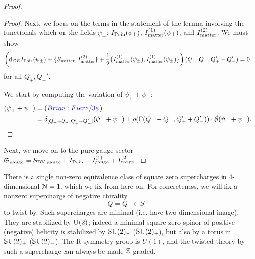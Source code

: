 \documentclass[10pt, oneside]{article}
\begin{document}
\begin{proof}
\begin{proof}
Next, we focus on the terms in the statement of the lemma involving the functionals which on the fields $\psi_{\pm}$: $I_{\rm Poin}(\psi_{\pm})$, $I^{(1)}_{\rm matter}(\psi_{\pm})$, and $I^{(2)}_{\rm matter}$. 
We must show
\[
\left({\rm d}_{CE} I_{\rm Poin}(\psi_\pm) + \{S_{\rm matter}, I_{\rm matter}^{(2)}\} + \frac{1}{2} \{I_{\rm matter}^{(1)}(\psi_\pm), I_{\rm matter}^{(1)}(\psi_\pm)\}\right) (Q_+, Q_-, Q_+' + Q_-') = 0.
\]
for all $Q_\pm, Q_\pm'$.

We start by computing the variation of $\psi_+ + \psi_-$:
\begin{align*}
[\delta_{Q_+ + Q_-}, \delta_{Q_+' + Q_-'}] (\psi_+ + \psi_-) & = \brian{Fierz / 3 \psi} \\ & = \delta_{[Q_+ + Q_-, Q_+' + Q_-']} (\psi_+ + \psi_-) \pm \rho(\Gamma(Q_++Q_-, Q_+' + Q_-')) \cdot \sd \dd (\psi_+ + \psi_-) .
\end{align*}
\end{proof} 

Next, we move on to the pure gauge sector $\mathfrak S_{\rm gauge} = S_{\rm BV, gauge} + I_{\rm Poin} + I^{(1)}_{\rm gauge} + I^{(2)}_{\rm gauge}$. 
\end{proof}


There is a single non-zero equivalence class of square zero supercharges in $4$-dimensional $\mathcal{N} = 1$, which we fix from here on.
For concreteness, we will fix a nonzero supercharge of negative chirality $$Q = Q_- \in S_-$$ to twist by. 
Such supercharges are minimal (i.e. have two dimensional image).  
They are stabilized by ${\rm U}(2)$; indeed a minimal square zero spinor of positive (negative) helicity is stabilized by $\mathrm{SU}(2)_-$ ($\mathrm{SU}(2)_+$), but also by a torus in $\mathrm{SU}(2)_+$ ($\mathrm{SU}(2)_-$).  
The R-symmetry group is $U(1)$, and the twisted theory by such a supercharge can always be made $\mathbb Z$-graded.
\end{document}
